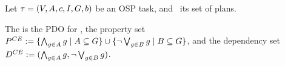 \begin{definition}
Let $\tau =
(V,\allowbreak A,\allowbreak{\ensuremath{c}},\allowbreak I,\allowbreak G,\allowbreak{\ensuremath{b}})$
be an OSP task, and \plans\ its set of plans.  

The  is the PDO for
\plans, the property set $P^{CE} := \{\bigwedge_{g \in A} g \mid
A \subseteq G\} \cup \{\neg \bigvee_{g \in B} g \mid B \subseteq G\}$,
and the dependency set $D^{CE} := (\bigwedge_{g \in A} g,\neg
\bigvee_{g \in B} g)$.
\end{definition}



































